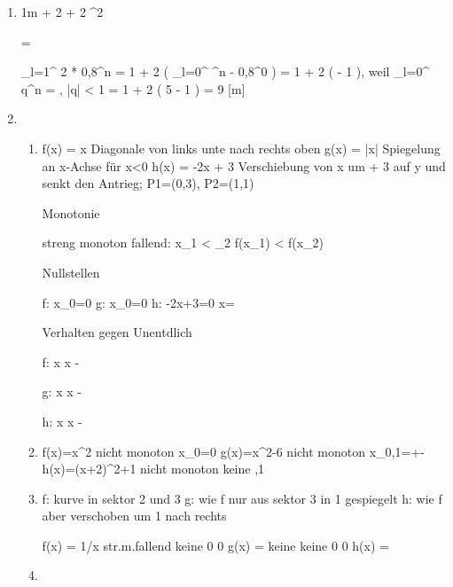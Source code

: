 
\begin{enumerate}

\item


1m + 2 \cdot {} + 2 \cdot {}^2

=

\Sigma_{l=1}^{\infty} 2 * 0,8^n
 = 1 + 2 \cdot ( \Sigma_{l=0}^{\infty} ^n - 0,8^0 )
= 1 + 2 \cdot (  - 1 ), weil  \Sigma_{l=0}^{\infty} q^n = , |q| < 1
= 1 + 2 \cdot ( 5 - 1 )
= 9 [m]



\item

\begin{enumerate}

\item
f(x) = x		Diagonale von links unte nach rechts oben
g(x) = |x|		Spiegelung an x-Achse für x<0
h(x) = -2x + 3	Verschiebung von x um + 3 auf y und senkt den Antrieg; P1=(0,3), P2=(1,1)

Monotonie

streng monoton fallend: x_1 < _2 \Rightarrow f(x_1) < f(x_2)

Nullstellen

f: x_0=0
g: x_0=0
h: -2x+3=0 x= 

Verhalten gegen Unentdlich

f:
x \righarrow \infty
x \righarrow -\infty

g:
x \righarrow \infty
x \righarrow -\infty

h:
x \righarrow \infty
x \righarrow -\infty

\item
f(x)=x^2				nicht monoton	x_0=0				\infty					\infty
g(x)=x^2-6				nicht monoton	x_{0,1}=+-	\infty					\infty
h(x)=(x+2)^2+1			nicht monoton	keine				\infty					{},1

\item

f:	kurve in sektor 2 und 3
g:	wie f nur aus sektor 3 in 1 gespiegelt
h:	wie f aber verschoben um 1 nach rechts

f(x) = 1/x				str.m.fallend	keine				0						0
g(x) = 	keine			keine				0						0
h(x) = 	

\item


\end{enumerate}
\end{enumerate}
